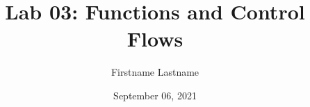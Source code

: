 \newcommand{\course}{MATH 3341}
\title{Lab 03: Functions and Control Flows}
\author{Firstname Lastname}
\date{September 06, 2021}
